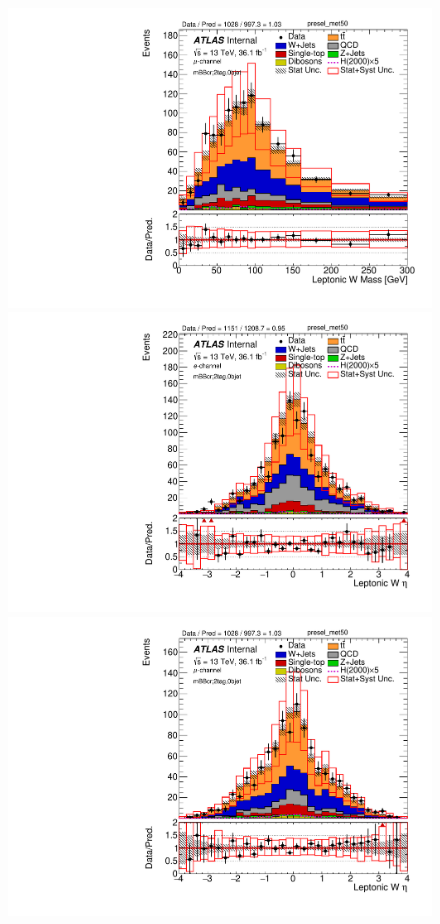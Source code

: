 \begin{figure}[!h]
\begin{center}
\includegraphics[scale=0.33]{./figures/boosted/PlotByChannels/DataMC_2tag_0bjet_mbbcr_muon_presel_met50_WlepMass}
\includegraphics[scale=0.33]{./figures/boosted/PlotByChannels/DataMC_2tag_0bjet_mbbcr_elec_presel_met50_WlepEta} 
\includegraphics[scale=0.33]{./figures/boosted/PlotByChannels/DataMC_2tag_0bjet_mbbcr_muon_presel_met50_WlepEta} 

\end{center}
\end{figure}
